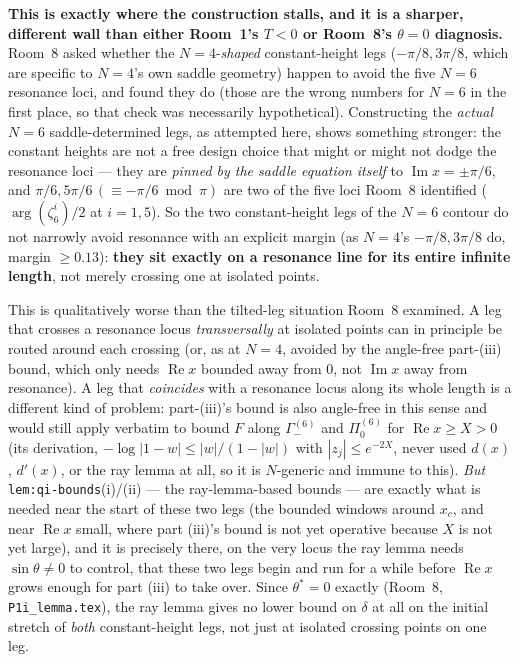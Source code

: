 \documentclass[11pt]{article}
\begin{document}
\textbf{This is exactly where the construction stalls, and it is a sharper, different wall than
either Room~1's $T<0$ or Room~8's $\theta=0$ diagnosis.} Room~8 asked whether the $N=4$-\emph{shaped}
constant-height legs ($-\pi/8,3\pi/8$, which are specific to $N=4$'s own saddle geometry) happen to
avoid the five $N=6$ resonance loci, and found they do (those are the wrong numbers for $N=6$ in the
first place, so that check was necessarily hypothetical). Constructing the \emph{actual} $N=6$
saddle-determined legs, as attempted here, shows something stronger: the constant heights are not a
free design choice that might or might not dodge the resonance loci --- they are \emph{pinned by the
saddle equation itself} to $\operatorname{Im}x=\pm\pi/6$, and $\pi/6,5\pi/6\,(\equiv-\pi/6\bmod\pi)$
are two of the five loci Room~8 identified ($\arg(\zeta_6^i)/2$ at $i=1,5$). So the two
constant-height legs of the $N=6$ contour do not narrowly avoid resonance with an explicit margin
(as $N=4$'s $-\pi/8,3\pi/8$ do, margin $\ge0.13$): \textbf{they sit exactly on a resonance line for
its entire infinite length}, not merely crossing one at isolated points.

This is qualitatively worse than the tilted-leg situation Room~8 examined. A leg that crosses a
resonance locus \emph{transversally} at isolated points can in principle be routed around each
crossing (or, as at $N=4$, avoided by the angle-free part-(iii) bound, which only needs
$\operatorname{Re}x$ bounded away from $0$, not $\operatorname{Im}x$ away from resonance). A leg
that \emph{coincides} with a resonance locus along its whole length is a different kind of problem:
part-(iii)'s bound is also angle-free in this sense and would still apply verbatim to bound $F$
along $\Gamma_-^{(6)}$ and $\Pi_0^{(6)}$ for $\operatorname{Re}x\ge X>0$ (its derivation, $-\log|1-w|\le
|w|/(1-|w|)$ with $|z_j|\le e^{-2X}$, never used $d(x)$, $d'(x)$, or the ray lemma at all, so it is
$N$-generic and immune to this). \emph{But} \texttt{lem:qi-bounds}(i)/(ii) --- the ray-lemma-based
bounds --- are exactly what is needed near the start of these two legs (the bounded windows around
$x_c$, and near $\operatorname{Re}x$ small, where part (iii)'s bound is not yet operative because
$X$ is not yet large), and it is precisely there, on the very locus the ray lemma needs
$\sin\theta\ne0$ to control, that these two legs begin and run for a while before $\operatorname{Re}x$
grows enough for part (iii) to take over. Since $\theta^\ast=0$ exactly (Room~8, \texttt{P1i\_lemma.tex}),
the ray lemma gives no lower bound on $\delta$ at all on the initial stretch of \emph{both}
constant-height legs, not just at isolated crossing points on one leg.
\end{document}
